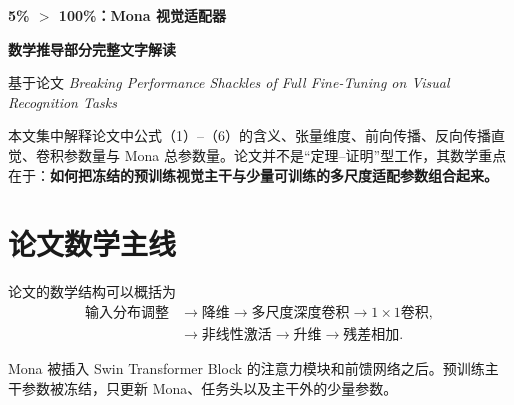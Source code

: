 \documentclass[UTF8,12pt,a4paper,fontset=none]{ctexart}
\begin{document}
\begin{center}
  {\LARGE\bfseries 5\% $>$ 100\%：Mona 视觉适配器}\par
  \vspace{0.35em}
  {\Large\bfseries 数学推导部分完整文字解读}\par
  \vspace{0.45em}
  {\small 基于论文 \textit{Breaking Performance Shackles of Full Fine-Tuning on Visual Recognition Tasks}}
\end{center}

\vspace{0.35em}

\begin{keybox}[阅读说明]
本文集中解释论文中公式（1）--（6）的含义、张量维度、前向传播、反向传播直觉、卷积参数量与 Mona 总参数量。论文并不是“定理--证明”型工作，其数学重点在于：\textbf{如何把冻结的预训练视觉主干与少量可训练的多尺度适配参数组合起来。}
\end{keybox}

\tableofcontents
\vspace{0.4em}

\section{论文数学主线}

论文的数学结构可以概括为
\begin{equation}
\begin{aligned}
\text{输入分布调整}
&\longrightarrow \text{降维}
\longrightarrow \text{多尺度深度卷积}
\longrightarrow 1\times1\text{卷积},\\
&\longrightarrow \text{非线性激活}
\longrightarrow \text{升维}
\longrightarrow \text{残差相加}.
\end{aligned}
\end{equation}

Mona 被插入 Swin Transformer Block 的注意力模块和前馈网络之后。预训练主干参数被冻结，只更新 Mona、任务头以及主干外的少量参数。
\end{document}

